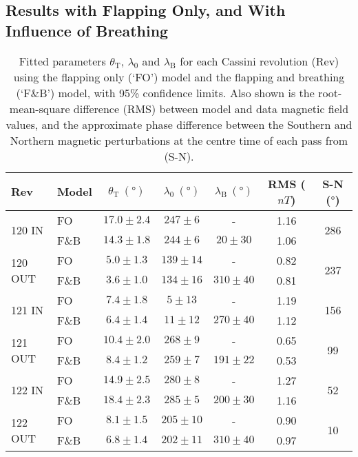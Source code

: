 \subsection{Results with Flapping Only, and With Influence of Breathing}\label{equinox:sec:mainresults}
\begin{table}
\caption[Fitted parameters for FO and F{\&}B models, for \textit{Cassini} Revs 120-122.]{Fitted parameters $\theta_\mathrm{T}$, $\lambda_0$ and $\lambda_\mathrm{B}$ for each Cassini revolution (Rev) using the flapping only (`FO') model and the flapping and breathing (`F{\&}B') model, with 95\% confidence limits. Also shown is the root-mean-square difference (RMS) between model and data magnetic field values, and the approximate phase difference between the Southern and Northern magnetic perturbations at the centre time of each pass from \citet{andrews2012} (S-N). }\label{equinox:table:fitparams}
\centering
\begin{tabular}{l l c c c c | c}
\hline
 Rev & Model & $\theta_\mathrm{T}~(\si\degree)$& $\lambda_0~(\si\degree)$ & $\lambda_\mathrm{B}~(\si\degree)$ & RMS ($\si{nT}$) & S-N ($\si{\degree}$) \\
\hline
\multirow{2}{*}{120 IN} 		& FO 		& $17.0\pm2.4$ 	& $247\pm6$ 	& -						& 1.16 	&	\multirow{2}{*}{286}\\
 											& F{\&}B 	& $14.3\pm1.8$ 	& $244\pm6$ 	& $20\pm30$ 	& 1.06	&\\ 
\multirow{2}{*}{120 OUT}	& FO 		& $5.0\pm1.3$ 		& $139\pm14$ 	& - 						& 0.82	& \multirow{2}{*}{237}\\
 											& F{\&}B 	& $3.6\pm1.0$ 		& $134\pm16$ 	& $310\pm40$ 	& 0.81 &\\ 
\multirow{2}{*}{121 IN} 		& FO 		& $7.4\pm1.8$ 		& $5\pm13$ 		& - 						& 1.19 & \multirow{2}{*}{156} \\
 											& F{\&}B 	& $6.4\pm1.4$ 		& $11\pm12$ 	& $270\pm40$	& 1.12 & \\ 
\multirow{2}{*}{121 OUT}	& FO 		& $10.4\pm2.0$ 	& $268\pm9$ 	& -						& 0.65 & \multirow{2}{*}{99}\\
											& F{\&}B 	& $8.4\pm1.2$ 		& $259\pm7$ 	& $191\pm22$ 	& 0.53 & \\ 
\multirow{2}{*}{122 IN}		& FO 		& $14.9\pm2.5$ 	& $280\pm8$	& -						& 1.27 & \multirow{2}{*}{52} \\
											& F{\&}B 	& $18.4\pm2.3$ 	& $285\pm5$ 	& $200\pm30$ &	1.16 &\\ 
\multirow{2}{*}{122 OUT}	& FO 		& $8.1\pm1.5$ 		& $205\pm10$ & -					& 0.90	& \multirow{2}{*}{10}\\
											& F{\&}B 	& $6.8\pm1.4$ 	& $202\pm11$ 	& $310\pm40$		&	0.97 &\\
\hline
\end{tabular}
\end{table}
